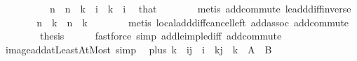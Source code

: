 \begin{isabellebody}
\ \ \isamarkupfalse%
\ {\isacharminus}{\kern0pt}\isanewline
\ \ \ \ \isamarkupfalse%
\ {\isachardoublequoteopen}n\ {\isacharequal}{\kern0pt}\ {\isacharparenleft}{\kern0pt}n\ {\isacharminus}{\kern0pt}\ {\isacharparenleft}{\kern0pt}k\ {\isacharplus}{\kern0pt}\ i{\isacharparenright}{\kern0pt}{\isacharparenright}{\kern0pt}\ {\isacharplus}{\kern0pt}\ {\isacharparenleft}{\kern0pt}k\ {\isacharplus}{\kern0pt}\ i{\isacharparenright}{\kern0pt}{\isachardoublequoteclose}\ \isamarkupfalse%
\ that\isanewline
\ \ \ \ \ \ \isamarkupfalse%
\ {\isacharparenleft}{\kern0pt}metis\ add{\isacharunderscore}{\kern0pt}commute\ le{\isacharunderscore}{\kern0pt}add{\isacharunderscore}{\kern0pt}diff{\isacharunderscore}{\kern0pt}inverse{\isacharparenright}{\kern0pt}\isanewline
\ \ \ \ \isamarkupfalse%
\ \isamarkupfalse%
\ {\isachardoublequoteopen}n\ {\isacharequal}{\kern0pt}\ k\ {\isacharplus}{\kern0pt}\ {\isacharparenleft}{\kern0pt}n\ {\isacharminus}{\kern0pt}\ k{\isacharparenright}{\kern0pt}{\isachardoublequoteclose}\isanewline
\ \ \ \ \ \ \isamarkupfalse%
\ {\isacharparenleft}{\kern0pt}metis\ local{\isachardot}{\kern0pt}add{\isacharunderscore}{\kern0pt}diff{\isacharunderscore}{\kern0pt}cancel{\isacharunderscore}{\kern0pt}left{\isacharprime}{\kern0pt}\ add{\isacharunderscore}{\kern0pt}assoc\ add{\isacharunderscore}{\kern0pt}commute{\isacharparenright}{\kern0pt}\isanewline
\ \ \isamarkupfalse%
\isanewline
\ \ \isamarkupfalse%
\ \isamarkupfalse%
\ {\isacharquery}{\kern0pt}thesis\isanewline
\ \ \ \ \isamarkupfalse%
\ {\isacharparenleft}{\kern0pt}fastforce\ simp{\isacharcolon}{\kern0pt}\ add{\isacharunderscore}{\kern0pt}le{\isacharunderscore}{\kern0pt}imp{\isacharunderscore}{\kern0pt}le{\isacharunderscore}{\kern0pt}diff\ add{\isachardot}{\kern0pt}commute{\isacharparenright}{\kern0pt}\isanewline
{}\isamarkupfalse%
%
\endisatagproof
{\isafoldproof}%
%
\isadelimproof
\isanewline
%
\endisadelimproof
\isanewline
{}\isamarkupfalse%
\ image{\isacharunderscore}{\kern0pt}add{\isacharunderscore}{\kern0pt}atLeastAtMost\ {\isacharbrackleft}{\kern0pt}simp{\isacharbrackright}{\kern0pt}{\isacharcolon}{\kern0pt}\isanewline
\ \ {\isachardoublequoteopen}plus\ k\ {\isacharbackquote}{\kern0pt}\ {\isacharbraceleft}{\kern0pt}i{\isachardot}{\kern0pt}{\isachardot}{\kern0pt}j{\isacharbraceright}{\kern0pt}\ {\isacharequal}{\kern0pt}\ {\isacharbraceleft}{\kern0pt}i\ {\isacharplus}{\kern0pt}\ k{\isachardot}{\kern0pt}{\isachardot}{\kern0pt}j\ {\isacharplus}{\kern0pt}\ k{\isacharbraceright}{\kern0pt}{\isachardoublequoteclose}\ {\isacharparenleft}{\kern0pt}\ {\isachardoublequoteopen}{\isacharquery}{\kern0pt}A\ {\isacharequal}{\kern0pt}\ {\isacharquery}{\kern0pt}B{\isachardoublequoteclose}{\isacharparenright}{\kern0pt}\isanewline

\end{isabellebody}
